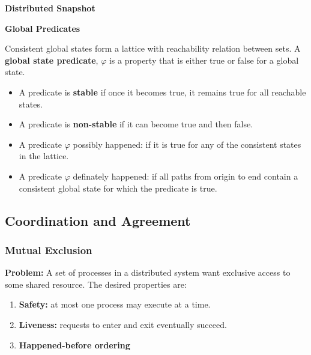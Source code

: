 \textbf{Distributed Snapshot}

\textbf{Global Predicates}

Consistent global states form a lattice with reachability relation between sets.
A \textbf{global state predicate}, $\varphi$ is a property that is either true or false for a global state.
\begin{itemize}
    \item A predicate is \textbf{stable} if once it becomes true, it remains true for all reachable states.
    \item A predicate is \textbf{non-stable} if it can become true and then false.
    \item A predicate $\varphi$ possibly happened: if it is true for any of the consistent states in the lattice.
    \item A predicate $\varphi$ definately happened: if all paths from origin to end contain a consistent global state for which the predicate is true.
\end{itemize}

\subsection{Coordination and Agreement}

\subsubsection*{Mutual Exclusion}

\textbf{Problem:} A set of processes in a distributed system want exclusive access to some shared resource.
The desired properties are:
\begin{enumerate}
    \item \textbf{Safety:} at most one process may execute at a time.
    \item \textbf{Liveness:} requests to enter and exit eventually succeed.
    \item \textbf{Happened-before ordering}
\end{enumerate}

